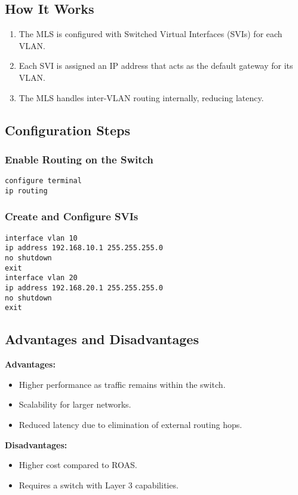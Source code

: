 \documentclass[a4paper]{book}
\begin{document}
\subsection{How It Works}
\begin{enumerate}
    \item The MLS is configured with Switched Virtual Interfaces (SVIs) for each VLAN.
    \item Each SVI is assigned an IP address that acts as the default gateway for its VLAN.
    \item The MLS handles inter-VLAN routing internally, reducing latency.
\end{enumerate}

\subsection{Configuration Steps}
\subsubsection{Enable Routing on the Switch}
\begin{lstlisting}
configure terminal
ip routing
\end{lstlisting}

\subsubsection{Create and Configure SVIs}
\begin{lstlisting}
interface vlan 10
ip address 192.168.10.1 255.255.255.0
no shutdown
exit
interface vlan 20
ip address 192.168.20.1 255.255.255.0
no shutdown
exit
\end{lstlisting}

\subsection{Advantages and Disadvantages}
\textbf{Advantages:}
\begin{itemize}
    \item Higher performance as traffic remains within the switch.
    \item Scalability for larger networks.
    \item Reduced latency due to elimination of external routing hops.
\end{itemize}

\textbf{Disadvantages:}
\begin{itemize}
    \item Higher cost compared to ROAS.
    \item Requires a switch with Layer 3 capabilities.
\end{itemize}
\end{document}
